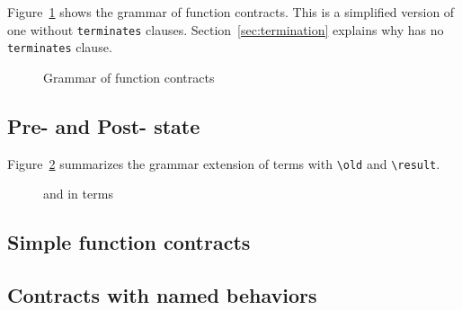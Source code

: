 
Figure~\ref{fig:gram:contracts} shows the grammar of function contracts. This is
a simplified version of \acsl one without \lstinline|terminates|
clauses. Section~\ref{sec:termination} explains why \eacsl has no
\lstinline|terminates| clause.

\begin{figure}[htbp]
  \begin{cadre}
      
   \end{cadre}
    \caption{Grammar of function contracts}
  \label{fig:gram:contracts}
\end{figure}


\subsection{Pre- and Post- state}
\label{sec:builtinconstructs}

\nodiff

Figure~\ref{fig:gram:oldandresult} summarizes the grammar extension of terms
with \lstinline|\old| and \lstinline|\result|.
\begin{figure}[htbp]
  \begin{cadre}
      
    \end{cadre}
    \caption{\protect\old and \protect\result in terms}
  \label{fig:gram:oldandresult}
\end{figure}


\subsection{Simple function contracts}
\label{sec:simplecontracts}

\nodiff



\subsection{Contracts with named behaviors}
\label{subsec:behaviors}

